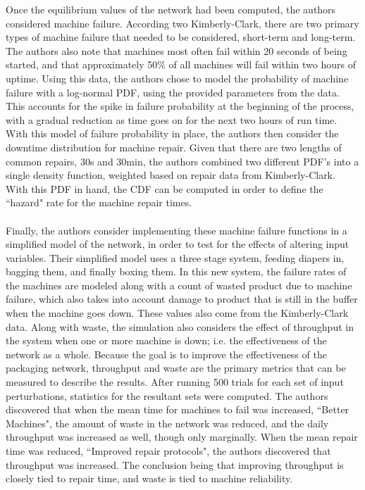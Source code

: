 \documentclass[letterpaper,10pt]{article}
\begin{document}
\begin{itemize}
Once the equilibrium values of the network had been computed, the authors considered machine failure. According two Kimberly-Clark, there are two primary types of machine failure that needed to be considered, short-term and long-term. The authors also note that machines most often fail within 20 seconds of being started, and that approximately 50\% of all machines will fail within two hours of uptime. Using this data, the authors chose to model the probability of machine failure with a log-normal PDF, using the provided parameters from the data. This accounts for the spike in failure probability at the beginning of the process, with a gradual reduction as time goes on for the next two hours of run time. With this model of failure probability in place, the authors then consider the downtime distribution for machine repair. Given that there are two lengths of common repairs, 30s and 30min, the authors combined two different PDF's into a single density function, weighted based on repair data from Kimberly-Clark. With this PDF in hand, the CDF can be computed in order to define the ``hazard" rate for the machine repair times.\\\\
Finally, the authors consider implementing these machine failure functions in a simplified model of the network, in order to test for the effects of altering input variables. Their simplified model uses a three stage system, feeding diapers in, bagging them, and finally boxing them. In this new system, the failure rates of the machines are modeled along with a count of wasted product due to machine failure, which also takes into account damage to product that is still in the buffer when the machine goes down. These values also come from the Kimberly-Clark data. Along with waste, the simulation also considers the effect of throughput in the system when one or more machine is down; i.e. the effectiveness of the network as a whole. Because the goal is to improve the effectiveness of the packaging network, throughput and waste are the primary metrics that can be measured to describe the results. After running 500 trials for each set of input perturbations, statistics for the resultant sets were computed. The authors discovered that when the mean time for machines to fail was increased, ``Better Machines", the amount of waste in the network was reduced, and the daily throughput was increased as well, though only marginally. When the mean repair time was reduced, ``Improved repair protocols", the authors discovered that throughput was increased. The conclusion being that improving throughput is closely tied to repair time, and waste is tied to machine reliability.

\end{itemize}
\end{document}
